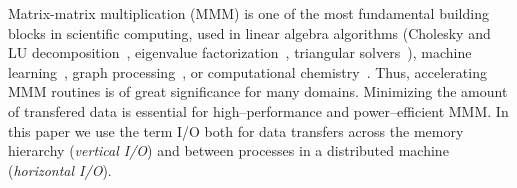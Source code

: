 \documentclass[sigplan,review,anonymous,10pt]{acmart}\settopmatter{printfolios=true,printccs=false,printacmref=false}
\begin{document}
%

Matrix-matrix multiplication (MMM) is one of the most fundamental building
blocks in scientific computing, used in linear algebra algorithms (Cholesky and
LU decomposition~\cite{meyer2000matrix}, eigenvalue
factorization~\cite{chatelin2012eigenvalues}, triangular
solvers~\cite{linearAlgebraLAPACK}), machine
learning~\cite{abadi2016tensorflow}, graph
processing~\cite{cormen2009introduction, azad2015parallel,
kepner2016mathematical, ng2002spectral, slimsell, maciejBC}, or computational 
chemistry~\cite{joost}. Thus, accelerating MMM routines is 
of great significance for many domains. 
Minimizing the amount of transfered data is essential for high--performance 
and  power--efficient MMM.
In this paper we use the term I/O both for data transfers across the memory 
hierarchy (\emph{vertical I/O}) and between processes in a distributed machine 
(\emph{horizontal I/O}).
\end{document}
